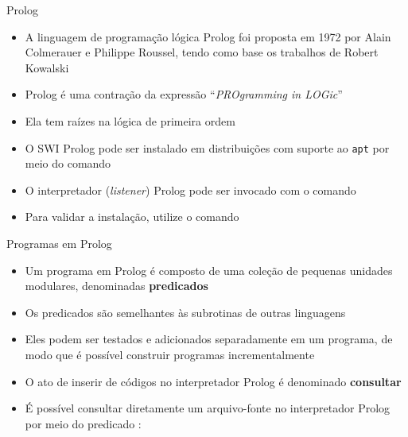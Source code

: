 \begin{frame}[fragile]{Prolog}

    \begin{itemize}
        \item A linguagem de programação lógica Prolog foi proposta em 1972 por 
           Alain Colmerauer e Philippe Roussel, tendo como base os trabalhos de Robert Kowalski 

        \item Prolog é uma contração da expressão ``\textit{PROgramming in LOGic}''

        \item Ela tem raízes na lógica de primeira ordem

        \item O SWI Prolog pode ser instalado em distribuições com suporte ao
            \texttt{apt} por meio do comando


        \item O interpretador (\textit{listener}) Prolog pode ser invocado com o comando


        \item Para validar a instalação, utilize o comando

    \end{itemize}

\end{frame}

\begin{frame}[fragile]{Programas em Prolog}

    \begin{itemize}

        \item Um programa em Prolog é composto de uma coleção de pequenas unidades modulares, 
            denominadas \textbf{predicados}

        \item Os predicados são semelhantes às subrotinas de outras linguagens

        \item Eles podem ser testados e adicionados separadamente em um programa, de modo que 
            é possível construir programas incrementalmente

        \item O ato de inserir de códigos no interpretador Prolog é denominado
            \textbf{consultar}

        \item É possível consultar diretamente um arquivo-fonte no interpretador Prolog por
            meio do predicado :


    \end{itemize}

\end{frame}

